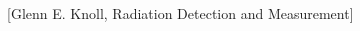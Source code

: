 \begin{thebibliography}{9}

[Glenn E. Knoll, Radiation Detection and Measurement]

\end{thebibliography}

